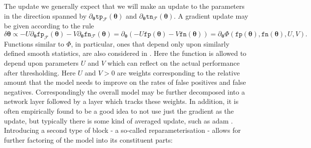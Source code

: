 \documentclass[10pt,a4paper]{article}
\begin{document}
The update  we generally expect that we will make an update to the parameters in the direction spanned by $\partial_{\boldsymbol\theta}\texttt{tp}_{\mathcal F}(\boldsymbol\theta)$ and $\partial_{\boldsymbol\theta}\texttt{tn}_{\mathcal F}(\boldsymbol\theta)$.
A gradient update may be given according to the rule
$$
\delta\boldsymbol\theta\propto-U\partial_{\boldsymbol\theta}\texttt{fp}_{\mathcal F}(\boldsymbol\theta)-V\partial_{\boldsymbol\theta}\texttt{fn}_{\mathcal F}(\boldsymbol\theta)=\partial_{\boldsymbol\theta}(-U\texttt{fp}(\boldsymbol\theta)-V\texttt{fn}(\boldsymbol\theta))=\partial_{\boldsymbol\theta}\Phi(\texttt{fp}(\boldsymbol\theta),\texttt{fn}(\boldsymbol\theta),U,V).
$$
Functions similar to $\Phi$, in particular, ones that depend only upon similarly defined smooth statistics, are also considered in \cite{marchetti2022score}.
Here the function is allowed to depend upon parameters $U$ and $V$ which can reflect on the actual performance after thresholding.
Here $U$ and $V>0$ are weights corresponding to the relative amount that the model needs to improve on the rates of false positives and false negatives.
Correspondingly the overall model may be further decomposed into a network layer followed by a layer which tracks these weights.
In addition, it is often empirically found to be a good idea to not use just the gradient as the update, but typically there is some kind of averaged update, such as adam \cite{kingma2017adammethodstochasticoptimization}.
Introducing a second type of block - a so-called reparameterisation - allows for further factoring of the model into its constituent parts:
\end{document}

